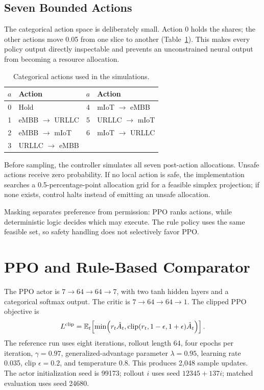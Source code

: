 \documentclass[conference]{IEEEtran}
\begin{document}
\subsection{Seven Bounded Actions}
The categorical action space is deliberately small. Action 0 holds the shares; the other actions move 0.05 from one slice to another (Table~\ref{tab:actions}). This makes every policy output directly inspectable and prevents an unconstrained neural output from becoming a resource allocation.

\begin{table}[t]
\centering
\caption{Categorical actions used in the simulations.}
\label{tab:actions}
\begin{tabular}{cl@{\qquad}cl}
\toprule
$a$ & Action & $a$ & Action \\
\midrule
0 & Hold & 4 & mIoT $\rightarrow$ eMBB \\
1 & eMBB $\rightarrow$ URLLC & 5 & URLLC $\rightarrow$ mIoT \\
2 & eMBB $\rightarrow$ mIoT & 6 & mIoT $\rightarrow$ URLLC \\
3 & URLLC $\rightarrow$ eMBB & & \\
\bottomrule
\end{tabular}
\end{table}

Before sampling, the controller simulates all seven post-action allocations. Unsafe actions receive zero probability. If no local action is safe, the implementation searches a 0.5-percentage-point allocation grid for a feasible simplex projection; if none exists, control halts instead of emitting an unsafe allocation.

Masking separates preference from permission: PPO ranks actions, while deterministic logic decides which may execute. The rule policy uses the same feasible set, so safety handling does not selectively favor PPO.

\section{PPO and Rule-Based Comparator}
The PPO actor is $7\!\rightarrow\!64\!\rightarrow\!64\!\rightarrow\!7$, with two tanh hidden layers and a categorical softmax output. The critic is $7\!\rightarrow\!64\!\rightarrow\!64\!\rightarrow\!1$. The clipped PPO objective is \cite{schulman2017}
\begin{equation}
L^{\rm clip}=\mathbb{E}_t\!\left[\min\!\left(r_t\hat A_t,
\operatorname{clip}(r_t,1-\epsilon,1+\epsilon)\hat A_t\right)\right].
\end{equation}
The reference run uses eight iterations, rollout length 64, four epochs per iteration, $\gamma=0.97$, generalized-advantage parameter $\lambda=0.95$, learning rate 0.035, clip $\epsilon=0.2$, and temperature 0.8. This produces 2,048 sample updates. The actor initialization seed is 99173; rollout $i$ uses seed $12345+137i$; matched evaluation uses seed 24680.
\end{document}
